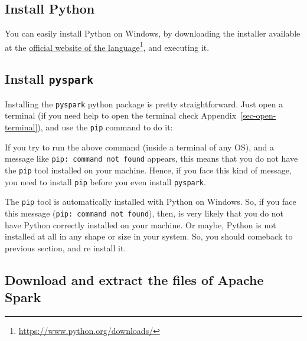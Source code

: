 \documentclass[
  11pt,
  letterpaper,
  DIV=11,
  numbers=noendperiod]{scrreprt}
\newenvironment{Shaded}{\begin{snugshade}}{\end{snugshade}}
\newcommand{\NormalTok}[1]{\textcolor[rgb]{0.00,0.23,0.31}{#1}}
\begin{document}
\hypertarget{install-python}{%
\subsection{Install Python}\label{install-python}}

You can easily install Python on Windows, by downloading the installer
available at the \href{https://www.python.org/downloads/}{official
website of the language}\footnote{\url{https://www.python.org/downloads/}},
and executing it.

\hypertarget{install-pyspark}{%
\subsection{\texorpdfstring{Install
\texttt{pyspark}}{Install pyspark}}\label{install-pyspark}}

Installing the \texttt{pyspark} python package is pretty
straightforward. Just open a terminal (if you need help to open the
terminal check Appendix~\ref{sec-open-terminal}), and use the
\texttt{pip} command to do it:

\begin{Shaded}
\end{Shaded}

If you try to run the above command (inside a terminal of any OS), and a
message like \texttt{pip:\ command\ not\ found} appears, this means that
you do not have the \texttt{pip} tool installed on your machine. Hence,
if you face this kind of message, you need to install \texttt{pip}
before you even install \texttt{pyspark}.

The \texttt{pip} tool is automatically installed with Python on Windows.
So, if you face this message (\texttt{pip:\ command\ not\ found}), then,
is very likely that you do not have Python correctly installed on your
machine. Or maybe, Python is not installed at all in any shape or size
in your system. So, you should comeback to previous section, and re
install it.

\hypertarget{download-and-extract-the-files-of-apache-spark}{%
\subsection{Download and extract the files of Apache
Spark}\label{download-and-extract-the-files-of-apache-spark}}
\end{document}
